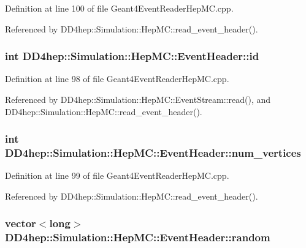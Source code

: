Definition at line 100 of file Geant4EventReaderHepMC.cpp.

Referenced by DD4hep::Simulation::HepMC::read\_\-event\_\-header().\hypertarget{class_d_d4hep_1_1_simulation_1_1_hep_m_c_1_1_event_header_a221f01143ced151a262de45ca6749cc4}{
\subsubsection[{id}]{\setlength{\rightskip}{0pt plus 5cm}int {\bf DD4hep::Simulation::HepMC::EventHeader::id}}}
\label{class_d_d4hep_1_1_simulation_1_1_hep_m_c_1_1_event_header_a221f01143ced151a262de45ca6749cc4}


Definition at line 98 of file Geant4EventReaderHepMC.cpp.

Referenced by DD4hep::Simulation::HepMC::EventStream::read(), and DD4hep::Simulation::HepMC::read\_\-event\_\-header().\hypertarget{class_d_d4hep_1_1_simulation_1_1_hep_m_c_1_1_event_header_a83354fc882a2fb46a053a524a7145eb1}{
\subsubsection[{num\_\-vertices}]{\setlength{\rightskip}{0pt plus 5cm}int {\bf DD4hep::Simulation::HepMC::EventHeader::num\_\-vertices}}}
\label{class_d_d4hep_1_1_simulation_1_1_hep_m_c_1_1_event_header_a83354fc882a2fb46a053a524a7145eb1}


Definition at line 99 of file Geant4EventReaderHepMC.cpp.

Referenced by DD4hep::Simulation::HepMC::read\_\-event\_\-header().\hypertarget{class_d_d4hep_1_1_simulation_1_1_hep_m_c_1_1_event_header_af705e3b582d71aef2b82d27e1056952b}{
\subsubsection[{random}]{\setlength{\rightskip}{0pt plus 5cm}vector$<$long$>$ {\bf DD4hep::Simulation::HepMC::EventHeader::random}}}
\label{class_d_d4hep_1_1_simulation_1_1_hep_m_c_1_1_event_header_af705e3b582d71aef2b82d27e1056952b}


